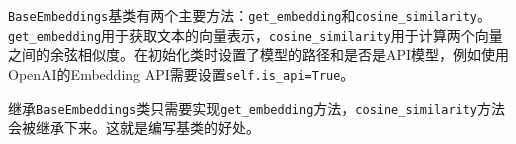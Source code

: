 \documentclass[12pt,a4paper]{book}
\begin{document}
\begin{Shaded}
\begin{Highlighting}[]
          
             

\OperatorTok{=}
\OperatorTok{=}
\OperatorTok{=}
        
\OperatorTok{=}\OperatorTok{*}
        \OperatorTok{==} \NormalTok{:}
             
            
        \OperatorTok{/}
\end{Highlighting}
\end{Shaded}

\texttt{BaseEmbeddings}基类有两个主要方法：\texttt{get\_embedding}和\texttt{cosine\_similarity}。\texttt{get\_embedding}用于获取文本的向量表示，\texttt{cosine\_similarity}用于计算两个向量之间的余弦相似度。在初始化类时设置了模型的路径和是否是API模型，例如使用OpenAI的Embedding
API需要设置\texttt{self.is\_api=True}。

继承\texttt{BaseEmbeddings}类只需要实现\texttt{get\_embedding}方法，\texttt{cosine\_similarity}方法会被继承下来。这就是编写基类的好处。
\end{document}
